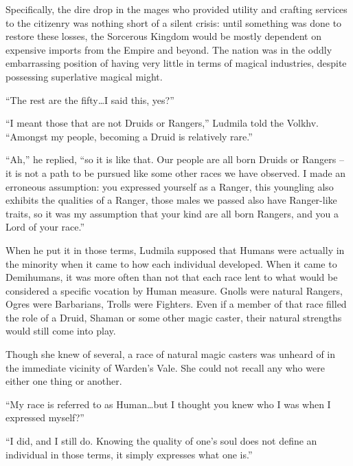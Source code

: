  

Specifically, the dire drop in the mages who provided utility and crafting services to the citizenry was nothing short of a silent crisis: until something was done to restore these losses, the Sorcerous Kingdom would be mostly dependent on expensive imports from the Empire and beyond. The nation was in the oddly embarrassing position of having very little in terms of magical industries, despite possessing superlative magical might.

 

“The rest are the fifty…I said this, yes?”

 

“I meant those that are not Druids or Rangers,” Ludmila told the Volkhv. “Amongst my people, becoming a Druid is relatively rare.”

 

“Ah,” he replied, “so it is like that. Our people are all born Druids or Rangers – it is not a path to be pursued like some other races we have observed. I made an erroneous assumption: you expressed yourself as a Ranger, this youngling also exhibits the qualities of a Ranger, those males we passed also have Ranger-like traits, so it was my assumption that your kind are all born Rangers, and you a Lord of your race.”

 

When he put it in those terms, Ludmila supposed that Humans were actually in the minority when it came to how each individual developed. When it came to Demihumans, it was more often than not that each race lent to what would be considered a specific vocation by Human measure. Gnolls were natural Rangers, Ogres were Barbarians, Trolls were Fighters. Even if a member of that race filled the role of a Druid, Shaman or some other magic caster, their natural strengths would still come into play.

 

Though she knew of several, a race of natural magic casters was unheard of in the immediate vicinity of Warden’s Vale. She could not recall any who were either one thing or another.

 

“My race is referred to as Human…but I thought you knew who I was when I expressed myself?”

 

“I did, and I still do. Knowing the quality of one’s soul does not define an individual in those terms, it simply expresses what one is.”

